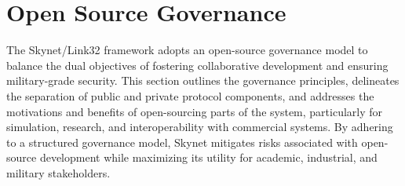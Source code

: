 \documentclass{article}
\begin{document}
\newpage
\tableofcontents

\section{Open Source Governance}
The Skynet/Link32 framework adopts an open-source governance model to balance
the dual objectives of fostering collaborative development and ensuring military-grade security.
This section outlines the governance principles, delineates the separation of
public and private protocol components, and addresses the motivations and
benefits of open-sourcing parts of the system, particularly for simulation,
research, and interoperability with commercial systems. By adhering to a
structured governance model, Skynet mitigates risks associated with open-source
development while maximizing its utility for academic, industrial,
and military stakeholders.
\end{document}
